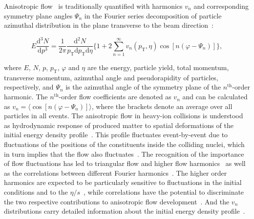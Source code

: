 Anisotropic flow~\cite{Ollitrault:1992bk} is traditionally quantified with harmonics $v_n$ and corresponding symmetry plane angles $\Psi_n$ in the Fourier series decomposition of particle azimuthal distribution in the plane transverse to the beam direction~\cite{Voloshin:1994mz}:

\begin{equation}
E\frac{\mathrm{d}^3N}{\mathrm{d}p^3} = \frac{1}{2\pi}\frac{\mathrm{d}^2N}{p_{\mathrm{T}}\mathrm{d}p_{\mathrm{T}}\mathrm{d}\eta} \Big\{1 + 2\sum_{n=1}^{\infty} v_n(p_{\mathrm{T}},\eta) \cos[n(\varphi - \Psi_n)]\Big\},
\label{Eq:Fourier}
\end{equation}

\noindent where $E$, $N$, $p$, $p_{\mathrm{T}}$, $\varphi$ and $\eta$ are the energy, particle yield, total momentum, transverse momentum, azimuthal angle and pseudorapidity of particles, respectively, and $\Psi_n$ is the azimuthal angle of the symmetry plane of the $n^{\mathrm{th}}$-order harmonic. The $n^{\mathrm{th}}$-order flow coefficients are denoted as $v_n$ and can be calculated as $v_{n} = \langle{\cos[n(\varphi - \Psi_n)]}\rangle$, where the brackets denote an average over all particles in all events.
The anisotropic flow in heavy-ion collisions is understood as hydrodynamic response of produced matter to spatial deformations of the initial energy density profile~\cite{Floerchinger:2013tya}.
This profile fluctuates event-by-event due to fluctuations of the positions of the constituents inside the colliding nuclei, which in turn implies that the flow also fluctuates~\cite{Miller:2003kd,Alver:2006wh}.
The recognition of the importance of flow fluctuations has led to triangular flow and higher flow harmonics~\cite{Alver:2010gr,ALICE:2011ab} as well as the correlations between different Fourier harmonics~\cite{Niemi:2012aj,Aad:2014fla}.
The higher order harmonics are expected to be particularly sensitive to fluctuations in the initial conditions and to the $\eta/s$~\cite{Alver:2010dn,Luzum:2012wu}, while correlations have the potential to discriminate the two respective contributions to anisotropic flow development~\cite{Niemi:2012aj}.
And the $v_{n}$ distributions carry detailed information about the initial energy density profile~\cite{Renk:2014jja,Yan:2014nsa}.

